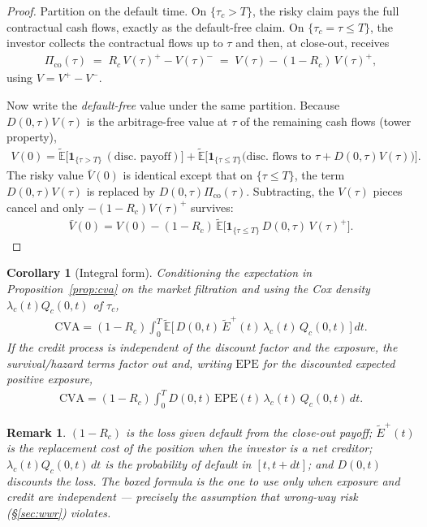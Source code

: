 \documentclass{report}
\theoremstyle{spacedplain}
\newtheorem{corollary}[theorem]{Corollary}
\theoremstyle{spaceddefinition}
\theoremstyle{spacedremark}
\newtheorem{remark}[theorem]{Remark}
\begin{document}
\begin{proof}
Partition on the default time. On $\{\tau_c>T\}$, the risky claim pays the full contractual cash flows, exactly as the default-free claim. On $\{\tau_c=\tau\le T\}$, the investor collects the contractual flows up to $\tau$ and then, at close-out, receives
\begin{align}
    \Pi_{\text{co}}(\tau) \;=\; R_c\,V(\tau)^+ - V(\tau)^-
    \;=\; V(\tau) - (1-R_c)\,V(\tau)^+ ,
\end{align}
using $V=V^+-V^-$.

Now write the \emph{default-free} value under the same partition. Because $D(0,\tau)V(\tau)$ is the arbitrage-free value at $\tau$ of the remaining cash flows (tower property),
\begin{align}
    V(0) = \widetilde{\mathbb{E}}\big[\mathbf{1}_{\{\tau>T\}}\,(\text{disc.\ payoff})\big]
    + \widetilde{\mathbb{E}}\big[\mathbf{1}_{\{\tau\le T\}}\big(\text{disc.\ flows to }\tau + D(0,\tau)V(\tau)\big)\big].
\end{align}
The risky value $\bar V(0)$ is identical except that on $\{\tau\le T\}$, the term $D(0,\tau)V(\tau)$ is replaced by $D(0,\tau)\Pi_{\text{co}}(\tau)$. Subtracting, the $V(\tau)$ pieces cancel and only $-(1-R_c)V(\tau)^+$ survives:
\begin{align}
    \bar V(0) = V(0) - (1-R_c)\,\widetilde{\mathbb{E}}\big[\mathbf{1}_{\{\tau\le T\}}\,D(0,\tau)\,V(\tau)^+\big].
\end{align}
\end{proof}

\begin{corollary}[Integral form]\label{cor:cva-int}
Conditioning the expectation in Proposition~\ref{prop:cva} on the market filtration and using the Cox density $\lambda_c(t)Q_c(0,t)$ of $\tau_c$,
\begin{align}
    \text{CVA} = (1-R_c)\int_0^T \widetilde{\mathbb{E}}\big[\,D(0,t)\,\widetilde{E}^+(t)\,\lambda_c(t)\,Q_c(0,t)\,\big]\,dt.
\end{align}
If the credit process is independent of the discount factor and the exposure, the survival/hazard terms factor out and, writing $\text{EPE}$ for the discounted expected positive exposure,
\begin{align}
    \boxed{\;\text{CVA} = (1-R_c)\int_0^T D(0,t)\,\text{EPE}(t)\,\lambda_c(t)\,Q_c(0,t)\,dt.\;}
\end{align}
\end{corollary}

\begin{remark}
$(1-R_c)$ is the loss given default from the close-out payoff; $\widetilde{E}^+(t)$ is the replacement cost of the position when the investor is a net creditor; $\lambda_c(t)Q_c(0,t)\,dt$ is the probability of default in $[t,t+dt]$; and $D(0,t)$ discounts the loss. The boxed formula is the one to use only when exposure and credit are independent --- precisely the assumption that wrong-way risk (\S\ref{sec:wwr}) violates.
\end{remark}
\end{document}
